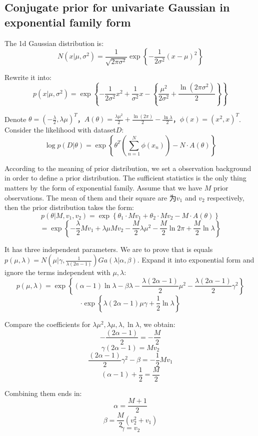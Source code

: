 \documentclass[UTF8]{ctexart}
\begin{document}
\subsection{Conjugate prior for univariate Gaussian in exponential family form}
The 1d Gaussian distribution is:
$$N(x|\mu,\sigma^{2})=\frac{1}{\sqrt{2\pi \sigma^{2}}}\exp\left\{-\frac{1}{2\sigma^{2}}(x-\mu)^{2} \right\}$$

Rewrite it into:
$$p(x|\mu,\sigma^{2})=\exp\left\{-\frac{1}{2\sigma^{2}}x^{2} + \frac{1}{\sigma^{2}}x -\left\{\frac{\mu^{2}}{2\sigma^{2}}+\frac{\ln(2\pi\sigma^{2})}{2}\right\}  \right\}$$

Denote $\theta = (-\frac{\lambda}{2},\lambda\mu)^{T}$，$A(\theta) =\frac{\lambda\mu^{2}}{2}+\frac{\ln(2\pi)}{2}-\frac{\ln \lambda}{2}$，$\phi(x)=(x^{2},x)^{T}$. Consider the likelihood with dataset$D$:
$$\log p(D|\theta) = \exp\left\{ \theta^{T}(\sum_{n=1}^{N}\phi(x_{n})) -N\cdot A(\theta) \right\}$$

According to the meaning of prior distribution, we set a observation background in order to define a prior distribution. The sufficient statistics is the only thing matters by the form of exponential family. Assume that we have $M$ prior observations. The mean of them and their square are 为$v_{1}$ and $v_{2}$ respectively, then the prior distribution takes the form:
$$p(\theta|M,v_{1},v_{2})=\exp\left\{ \theta_{1}\cdot Mv_{1} + \theta_{2}\cdot Mv_{2} - M\cdot A(\theta) \right\}$$
$$=\exp\left\{-\frac{\lambda}{2}Mv_{1}+\lambda\mu Mv_{2} - \frac{M}{2}\lambda\mu^{2}-\frac{M}{2}\ln 2\pi + \frac{M}{2}\ln \lambda  \right\}$$

It has three independent parameters. We are to prove that is equals $p(\mu,\lambda)=N(\mu|\gamma,\frac{1}{\lambda(2\alpha-1)})Ga(\lambda|\alpha,\beta)$. Expand it into exponential form and ignore the terms independent with $\mu,\lambda$:
$$p(\mu,\lambda)=\exp\left\{ (\alpha-1)\ln \lambda - \beta\lambda -\frac{\lambda(2\alpha-1)}{2}\mu^{2}-\frac{\lambda(2\alpha-1)}{2}\gamma^{2}\right\}$$
$$\cdot\exp\left\{\lambda(2\alpha-1)\mu\gamma+\frac{1}{2}\ln \lambda \right\}$$

Compare the coefficients for $\lambda \mu^{2},\lambda \mu,\lambda,\ln \lambda$, we obtain:
$$-\frac{(2\alpha-1)}{2} = -\frac{M}{2}$$
$$\gamma(2\alpha-1)=Mv_{2}$$
$$\frac{(2\alpha-1)}{2}\gamma^{2}-\beta=-\frac{1}{2}Mv_{1}$$
$$(\alpha-1)+\frac{1}{2}=\frac{M}{2}$$

Combining them ends in:
$$\alpha = \frac{M+1}{2}$$
$$\beta = \frac{M}{2}(v_{2}^{2}+v_{1})$$
$$\gamma = v_{2}$$
\end{document}
